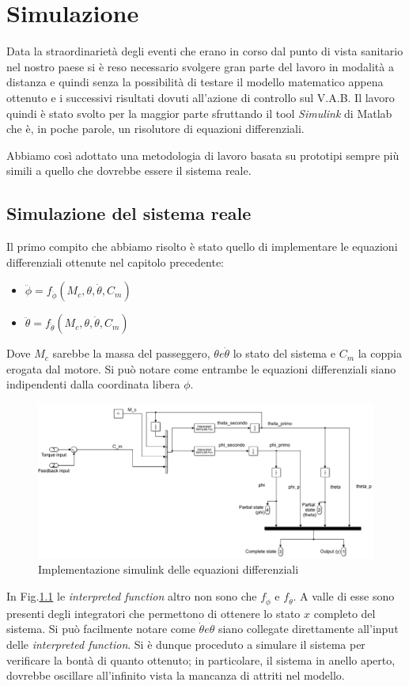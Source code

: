 \chapter{Simulazione}
Data la straordinarietà degli eventi che erano in corso dal punto di vista sanitario nel nostro paese si è reso necessario svolgere gran parte del lavoro in modalità a distanza e quindi senza la possibilità di testare il modello matematico appena ottenuto e i successivi risultati dovuti all'azione di controllo sul V.A.B. Il lavoro quindi è stato svolto per la maggior parte sfruttando il tool \textit{Simulink} di Matlab che è, in poche parole, un risolutore di equazioni differenziali.

Abbiamo così adottato una metodologia di lavoro basata su prototipi sempre più simili a quello che dovrebbe essere il sistema reale.
\section{Simulazione del sistema reale}
Il primo compito che abbiamo risolto è stato quello di implementare le equazioni differenziali ottenute nel capitolo precedente:
\begin{itemize}
	\item $\ddot{\phi} = f_{\ddot{\phi}} (M_c,\theta,\dot{\theta},C_m)$
	\item $\ddot{\theta} = f_{\ddot{\theta}} (M_c,\theta,\dot{\theta},C_m)$
\end{itemize}

Dove $M_c$ sarebbe la massa del passeggero, $\theta e \dot{\theta}$ lo stato del sistema e $C_m$  la coppia erogata dal motore. Si può notare come entrambe le equazioni differenziali siano indipendenti dalla coordinata libera $\phi$.
 \begin{figure}[H]
	\centering   	
	\includegraphics[width=1\textwidth]{Immagini/non_linear_system.png}
	\caption{Implementazione simulink delle equazioni differenziali}
	\label{fig:non_linear_system}
\end{figure}
In Fig.\ref{fig:non_linear_system} le \textit{interpreted function} altro non sono che  $f_{\ddot{\phi}}$ e $f_{\ddot{\theta}}$. A valle di esse sono presenti degli integratori che permettono di ottenere lo stato $x$ completo del sistema. Si può facilmente notare come $\dot{\theta} e \theta$ siano collegate direttamente all'input delle \textit{interpreted function}.
Si è dunque proceduto a  simulare il sistema per verificare la bontà di quanto ottenuto; in particolare, il sistema in anello aperto, dovrebbe oscillare all'infinito vista la mancanza di attriti nel modello.

